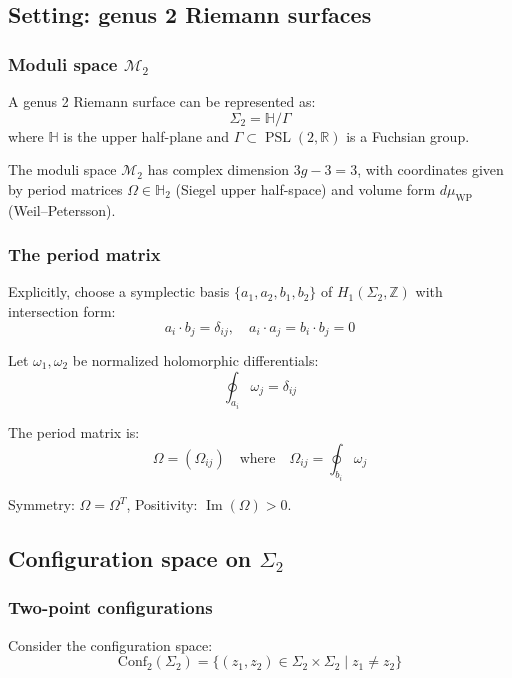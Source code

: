 \subsection{Setting: genus 2 Riemann surfaces}

\subsubsection{\texorpdfstring{Moduli space $\mathcal{M}_2$}{Moduli space M-2}}

A genus 2 Riemann surface can be represented as:
\[\Sigma_2 = \mathbb{H}/\Gamma\]
where $\mathbb{H}$ is the upper half-plane and $\Gamma \subset \operatorname{PSL}(2,\mathbb{R})$
is a Fuchsian group.

The moduli space $\mathcal{M}_2$ has complex dimension $3g-3 = 3$, with coordinates given by period matrices $\Omega \in \mathbb{H}_2$ (Siegel upper half-space) and volume form $d\mu_{\text{WP}}$ (Weil--Petersson).

\subsubsection{The period matrix}

Explicitly, choose a symplectic basis $\{a_1, a_2, b_1, b_2\}$ of $H_1(\Sigma_2, \mathbb{Z})$
with intersection form:
\[a_i \cdot b_j = \delta_{ij}, \quad a_i \cdot a_j = b_i \cdot b_j = 0\]

Let $\omega_1, \omega_2$ be normalized holomorphic differentials:
\[\oint_{a_i} \omega_j = \delta_{ij}\]

The period matrix is:
\[\Omega = (\Omega_{ij}) \quad \text{where} \quad \Omega_{ij} = \oint_{b_i} \omega_j\]

Symmetry: $\Omega = \Omega^T$, Positivity: $\operatorname{Im}(\Omega) > 0$.

\subsection{\texorpdfstring{Configuration space on $\Sigma_2$}{Configuration space on Sigma-2}}

\subsubsection{Two-point configurations}

Consider the configuration space:
\[\mathrm{Conf}_2(\Sigma_2) = \{(z_1, z_2) \in \Sigma_2 \times \Sigma_2 \mid z_1 \neq z_2 \}\]

